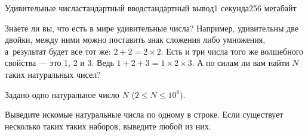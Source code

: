 \begin{problem}{Удивительные числа}{стандартный ввод}{стандартный вывод}{1 секунда}{256 мегабайт}

Знаете ли вы, что есть в мире удивительные числа? Например, удивительны две двойки, между ними можно поставить знак сложения либо умножения, а~результат будет все тот же: $2 + 2 = 2 \times 2$. Есть и три числа того же волшебного свойства --- это 1, 2 и 3. Ведь $1 + 2 + 3 = 1 \times 2 \times 3$. А по силам ли вам найти $N$ таких натуральных чисел?

\InputFile
Задано одно натуральное число $N$ ($2 \le N \le 10^6$).

\OutputFile
Выведите искомые натуральные числа по одному в строке. Если существует несколько таких таких наборов, выведите любой из них.

\Examples

\begin{example}
%
%
\end{example}

\end{problem}

